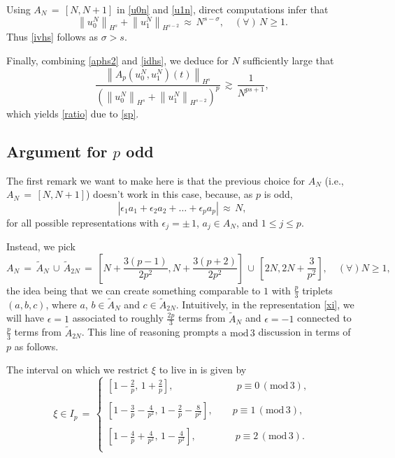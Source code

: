 \documentclass{amsart}
\begin{document}
Using $A_N\,=\,[N,N+1]$ in \eqref{u0n} and \eqref{u1n}, direct computations infer that 
\begin{equation}
\left\|u_0^N\right\|_{H^{s}} + \left\|u_1^N\right\|_ {H^{{s}-2}}\,\approx\,N^{s-\sigma},\quad (\forall)\,N\geq 1.\label{idhs} 
\end{equation}
Thus \eqref{ivhs} follows as $\sigma>s$. 

Finally,  combining \eqref{aphs2} and \eqref{idhs}, we deduce for $N$ sufficiently large that
\begin{equation}
 \frac{\left\|A_{p}(u_0^N,u_1^N)(t)\right\|_{H^s}}{\left(\left\|u_0^N\right\|_{H^{s}} + \left\|u_1^N\right\|_ {H^{{s}-2}}\right)^p}\,\gtrsim\, \frac{1}{N^{ps+1}},\end{equation}
which yields \eqref{ratio} due to \eqref{sp}.

\subsection{Argument for $p$ odd}
The first remark we want to make here is that the previous choice for $A_N$ (i.e., $A_N\,=\,[N,N+1]$) doesn't work in this case, because, as $p$ is odd, 
\[
\left|\epsilon_1 a_1+\epsilon_2 a_2+ \ldots+\epsilon_p a_p\right|\,\approx\,N, 
\]
for all possible representations with $\epsilon_j=\pm \,1$, $a_j\in A_N$,  and $1\leq j\leq p$. 

Instead, we pick
\[
A_N\,=\,\tilde{A}_N\,\cup\,\tilde{A}_{2N}\,=\,\left[N+\frac{3(p-1)}{2p^2},N+\frac{3(p+2)}{2p^2}\right]\,\cup\, \left[2N, 2N+\frac{3}{p^2}\right], \quad (\forall) N \geq 1,
\]
the idea being that we can create something comparable to $1$ with $\frac p3$ triplets $(a,b,c)$, where $a$, $b \in \tilde{A}_N$ and $c \in \tilde{A}_{2N}$. Intuitively, in the representation \eqref{xi}, we will have $\epsilon=1$ associated to roughly $\frac{2p}{3}$ terms from $\tilde{A}_N$ and  $\epsilon=-1$ connected to $\frac p3$ terms from $\tilde{A}_{2N}$. This line of reasoning prompts a $\text{mod}\,3$ discussion in terms of $p$ as follows.

The interval on which we restrict $\xi$ to live in is given by
\begin{equation}
\xi \in I_p\,=\, \left\{
\begin{array}{l}
\left[1-\frac{2}{p}, \,1+\frac{2}{p}\right],  \qquad \qquad \qquad \ \ p\equiv 0\, (\text{mod}\,3),\\
\\
\left[1-\frac{3}{p}-\frac{4}{p^2}, \, 1-\frac{2}{p}-\frac{8}{p^2}\right], \qquad  p\equiv 1\,(\text{mod}\,3),\\
\\
\left[1-\frac{4}{p}+\frac{4}{p^2}, \,1-\frac{4}{p^2}\right], \qquad  \qquad p\equiv 2\,(\text{mod}\,3).\\
\end{array}\right.
\end{equation}
\end{document}
